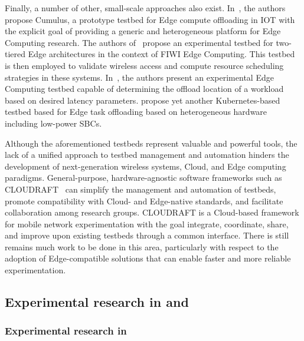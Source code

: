 Finally, a number of other, small-scale approaches also exist.
In~\cite{gedawy2016cumulus}, the authors propose Cumulus, a prototype testbed for Edge compute offloading in \gls{IOT} with the explicit goal of providing a generic and heterogeneous platform for Edge Computing research.
The authors of~\cite{rimal2018experimental} propose an experimental testbed for two-tiered Edge architectures in the context of \gls{FIWI} Edge Computing.
This testbed is then employed to validate wireless access and compute resource scheduling strategies in these systems.
In~\cite{yamanaka2021design}, the authors present an experimental Edge Computing testbed capable of determining the offload location of a workload based on desired latency parameters.
\cite{diao2019scalable} propose yet another Kubernetes-based testbed based for Edge task offloading based on heterogeneous hardware including low-power \glspl{SBC}.

Although the aforementioned testbeds represent valuable and powerful tools, the lack of a unified approach to testbed management and automation hinders the development of next-generation wireless systems, Cloud, and Edge computing paradigms.
General-purpose, hardware-agnostic software frameworks such as \gls{CLOUDRAFT}~\cite{moorthy2022cloudraft}  can simplify the management and automation of testbeds, promote compatibility with Cloud- and Edge-native standards, and facilitate collaboration among research groups.
\gls{CLOUDRAFT} is a Cloud-based framework for mobile network experimentation with the goal integrate, coordinate, share, and improve upon existing testbeds through a common interface.
There is still remains much work to be done in this area, particularly with respect to the adoption of Edge-compatible solutions that can enable faster and more reliable experimentation.

\subsection{Experimental research in  and }

\subsubsection{Experimental research in }\label{sec:relwork:xremulation}

